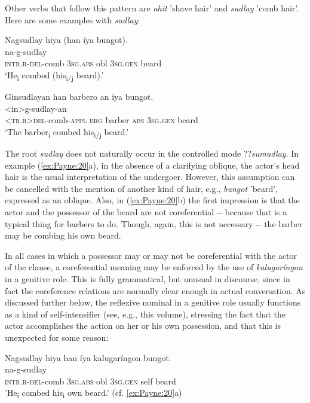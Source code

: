 \documentclass[output=paper]{langscibook}
\begin{document}
Other verbs that follow this pattern are \textit{ahit} 'shave hair' and \textit{sudlay} 'comb hair'. Here are some examples with \textit{sudlay}:

%
\ea \label{ex:Payne:20}
\ea
\glll Nagsudlay hiya (han íya bungot).\\
 na-g-sudlay { } { } { } { }\\
 \textsc{intr.r-del}-comb 3\textsc{sg.abs} {obl} 3\textsc{sg.gen} beard\\
\glt ‘He\textsubscript{i} combed (his\textsubscript{i/j} beard).'

\ex
\glll Ginsudlayan han barbero an íya bungot.\\
 <in>g-sudlay-an { } { } { } { } { }\\
 \textsc{<tr.r}>\textsc{del-}comb-\textsc{appl} \textsc{erg} barber \textsc{abs} 3\textsc{sg.gen} beard\\
 \glt ‘The barber\textsubscript{i} combed his\textsubscript{i/j} beard.'
 \z
 \z
 
The root \textit{sudlay} does not naturally occur in the controlled mode ??\textit{sumudlay}. In example (\ref{ex:Payne:20}a), in the absence of a clarifying oblique, the actor's head hair is the usual interpretation of the undergoer. However, this assumption can be cancelled with the mention of another kind of hair, e.g., \textit{bungot} 'beard', expressed as an oblique. Also, in (\ref{ex:Payne:20}b) the first impression is that the actor and the possessor of the beard are not coreferential -{}- because that is a typical thing for barbers to do. Though, again, this is not necessary -{}- the barber may be combing his own beard. 

In all cases in which a possessor may or may not be coreferential with the actor of the clause, a coreferential meaning may be enforced by the use of \textit{kalugaríngon} in a genitive role. This is fully grammatical, but unusual in discourse, since in fact the coreference relations are normally clear enough in actual conversation. As discussed further below, the reflexive nominal in a genitive role usually functions as a kind of self-intensifier (see, e.g., \citealt{Haspelmath2020} this volume), stressing the fact that the actor accomplishes the action on her or his own possession, and that this is unexpected for some reason:

\ea
\label{ex:Payne:21}
\ea
\glll
{Nagsudlay} {hiya} {han} {íya} {kalugaríngon} {bungot.}\\
 na-g-sudlay { } { } { } { } { }\\
 \textsc{intr.r-del}{}-comb 3\textsc{sg.abs} {obl} 3\textsc{sg.gen} self beard\\
 \glt'He\textsubscript{i} combed his\textsubscript{i} own beard.' (cf. \ref{ex:Payne:20}a)
\end{document}
